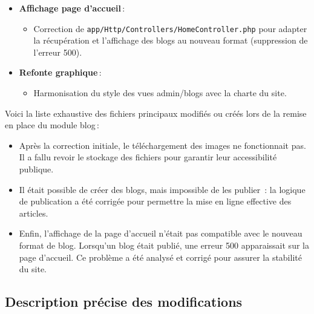 \documentclass[a4paper,12pt]{report}
\begin{document}
\begin{itemize}
\begin{itemize}
    \end{itemize}
    \item \textbf{Affichage page d’accueil} :
    \begin{itemize}
        \item Correction de \texttt{app/Http/Controllers/HomeController.php} pour adapter la récupération et l’affichage des blogs au nouveau format (suppression de l’erreur 500).
    \end{itemize}
    \item \textbf{Refonte graphique} :
    \begin{itemize}
        \item Harmonisation du style des vues admin/blogs avec la charte du site.
    \end{itemize}
\end{itemize}


Voici la liste exhaustive des fichiers principaux modifiés ou créés lors de la remise en place du module blog :
\begin{itemize}
    \item Après la correction initiale, le téléchargement des images ne fonctionnait pas. Il a fallu revoir le stockage des fichiers pour garantir leur accessibilité publique.
    \item Il était possible de créer des blogs, mais impossible de les publier : la logique de publication a été corrigée pour permettre la mise en ligne effective des articles.
    \item Enfin, l’affichage de la page d’accueil n’était pas compatible avec le nouveau format de blog. Lorsqu’un blog était publié, une erreur 500 apparaissait sur la page d’accueil. Ce problème a été analysé et corrigé pour assurer la stabilité du site.
\end{itemize}

\subsection{Description précise des modifications}
\end{document}
